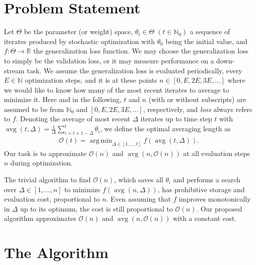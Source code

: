\documentclass[twocolumn]{article}
\DeclareMathOperator*{\argmin}{arg\,min}
\DeclareMathOperator*{\avg}{avg}
\newcommand*{\natnum}{\mathbb{N}}
\newcommand*{\natnumzero}{\mathbb{N}_0}
\newcommand{\Rb}{\mathbb{R}}
\newcommand{\OL}{\mathcal{O}}
\begin{document}
\section{Problem Statement}
\label{sec:tta-problem-statement}

Let $\Theta$ be the parameter (or weight) space, $\theta_t \in \Theta$ $(t \in \natnumzero)$ a sequence of iterates produced by stochastic optimization with $\theta_0$ being the initial value, and $f \colon \Theta \to \Rb$ the generalization loss function.
We may choose the generalization loss to simply be the validation loss, or it may measure performance on a down-stream task.
We assume the generalization loss is evaluated periodically, every $E \in \natnum$ optimization steps, and it is at these points $n \in [0, E, 2E, 3E, \dots]$ where we would like to know how many of the most recent iterates to average to minimize it.
Here and in the following, $t$ and $n$ (with or without subscripts) are assumed to be from $\natnumzero$ and $[0, E, 2E, 3E, \dots]$, respectively, and \emph{loss} always refers to $f$.
Denoting the average of most recent $\Delta$ iterates up to time step $t$ with $\avg(t, \Delta) = \frac{1}{\Delta} \sum_{i=t+1-\Delta}^{t} \theta_i$, we define the optimal averaging length as
\begin{align*}
\OL(t) = \argmin_{\Delta \in [1, \dots, t]} f(\avg(t, \Delta)).
\end{align*}
Our task is to approximate $\OL(n)$ and $\avg(n, \OL(n))$ at all evaluation steps $n$ during optimization.

The trivial algorithm to find $\OL(n)$, which saves all $\theta_i$ and performs a search over $\Delta \in [1, \dots, n]$ to minimize $f(\avg(n, \Delta))$, has prohibitive storage and evaluation cost, proportional to $n$.
Even assuming that $f$ improves monotonically in $\Delta$ up to its optimum, the cost is still proportional to $\OL(n)$.
Our proposed algorithm approximates $\OL(n)$ and $\avg(n, \OL(n))$ with a constant cost.


\section{The Algorithm}
\label{sec:tta-algorithm}
\end{document}
